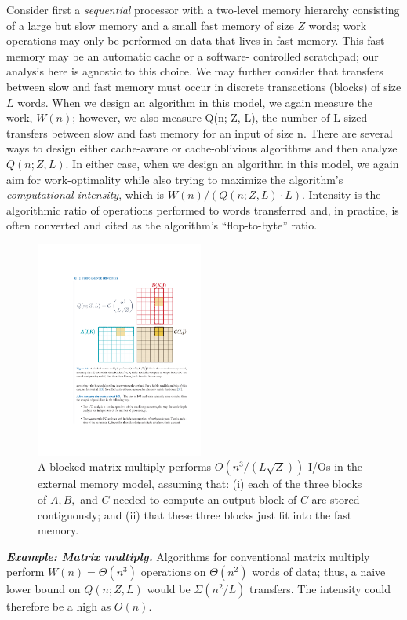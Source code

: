 \documentclass[twocolumn]{article}
\begin{document}
Consider first a \textit{sequential} processor with a two-level memory hierarchy consisting of a large but slow memory and a small fast memory of size $Z$ words; work operations may only be performed on data that lives in fast memory. This fast memory may be an automatic cache or a software- controlled scratchpad; our analysis here is agnostic to this choice. We may further consider that transfers between slow and fast memory must occur in discrete transactions (blocks) of size $L$ words. When we design an algorithm in this model, we again measure the work, $W (n)$; however, we also measure Q(n; Z, L), the number of L-sized transfers between slow and fast memory for an input of size n. There are several ways to design either cache-aware or cache-oblivious algorithms and then analyze $Q(n; Z, L)$. 
In either case, when we design an algorithm in this model, we again aim for work-optimality while also trying to maximize the algorithm’s \textit{computational intensity}, which is $W (n)/ (Q(n; Z, L) \cdot L)$. Intensity is the algorithmic ratio of operations performed to words transferred and, in practice, is often converted and cited as the algorithm’s “flop-to-byte” ratio.
\begin{figure}[htb]
        \centering
        \includegraphics[width=0.49\textwidth]{block-matrix.pdf}
        \caption{A blocked matrix multiply performs $O(n^3/(L\sqrt Z))$ I/Os in the external memory model, assuming that: 
(i) each of the three blocks of $A, B,$ and $C$ needed to compute an output block of $C$ are stored contiguously; and (ii) that these three blocks just fit into the fast memory.}
        \label{fig:block-matrix}
\end{figure}

\noindent
\textbf{\textit{Example: Matrix multiply.}} 
Algorithms for conventional matrix multiply perform $W(n) = \Theta(n^3)$ operations on $ \Theta(n^2)$ words of data;
thus, a naive lower bound on $Q(n; Z, L)$ would be $\Sigma(n^2/L)$ transfers. The intensity could therefore be a high as $O(n)$.
\end{document}
